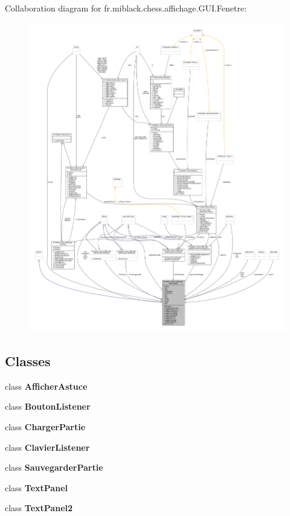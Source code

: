 Collaboration diagram for fr.\-miblack.\-chess.\-affichage.\-G\-U\-I.\-Fenetre\-:
\nopagebreak
\begin{figure}[H]
\begin{center}
\leavevmode
\includegraphics[width=350pt]{classfr_1_1miblack_1_1chess_1_1affichage_1_1GUI_1_1Fenetre__coll__graph}
\end{center}
\end{figure}
\subsection*{Classes}
\begin{DoxyCompactItemize}
\item 
class {\bfseries Afficher\-Astuce}
\item 
class {\bfseries Bouton\-Listener}
\item 
class {\bfseries Charger\-Partie}
\item 
class {\bfseries Clavier\-Listener}
\item 
class {\bfseries Sauvegarder\-Partie}
\item 
class {\bfseries Text\-Panel}
\item 
class {\bfseries Text\-Panel2}
\end{DoxyCompactItemize}
